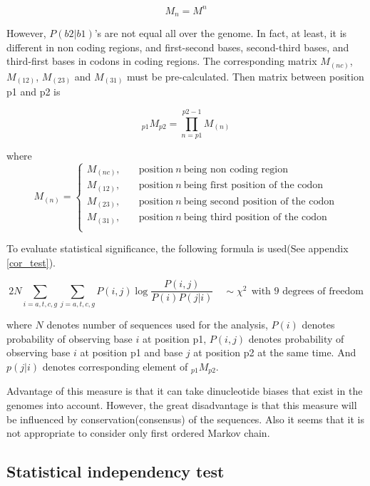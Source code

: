 \[
 M_{n} = M^{n}
\]

However, \(P(b2|b1)\)'s are not equal all over the genome. In fact, at
least, it is different in non coding regions, and first-second bases,
second-third bases, and third-first bases in codons in coding
regions\cite{label301}. The corresponding matrix \(M_{(nc)}\),
\(M_{(12)}\), \(M_{(23)}\) and \(M_{(31)}\) must be pre-calculated. Then
matrix between position p1 and p2 is

\[ 
_{p1}M_{p2} = \prod_{n=p1}^{p2-1}M_{(n)}
\]

\noindent
where
\[M_{(n)} = \left\{
   \begin{array}{ll}
 M_{(nc)}, & \quad \mbox{position}\:n\:\mbox{being non coding region}\\
 M_{(12)}, & \quad \mbox{position}\:n\:\mbox{being first position of the codon}\\
 M_{(23)}, & \quad \mbox{position}\:n\:\mbox{being second position of the codon}\\
 M_{(31)}, & \quad \mbox{position}\:n\:\mbox{being third position of the codon}\\
   \end{array}
   \right.
\]

\vspace{1em}

To evaluate statistical significance, the following formula is used(See appendix \ref{cor_test}).

\[
2N\sum_{i=a,t,c,g}\sum_{j=a,t,c,g}
                        P(i,j)\log\frac{P(i,j)}{P(i)P(j|i)} \quad \sim \chi^{2} \:\: \mbox{with 9 degrees of freedom}
\]

\noindent
where \(N\) denotes number of sequences used for the analysis,
\(P(i)\) denotes probability of observing base \(i\) at position p1,
\(P(i,j)\) denotes probability of observing base \(i\) at position p1 
and base \(j\) at position p2 at the same time. And \(p(j|i)\) denotes
corresponding element of \(_{p1}M_{p2}\).

Advantage of this measure is that it can take dinucleotide biases that
exist in the genomes into account. However, the great disadvantage is
that this measure will be influenced by conservation(consensus) of the
sequences. Also it seems that it is not appropriate to consider only
first ordered Markov chain.

\subsection{Statistical independency test}

